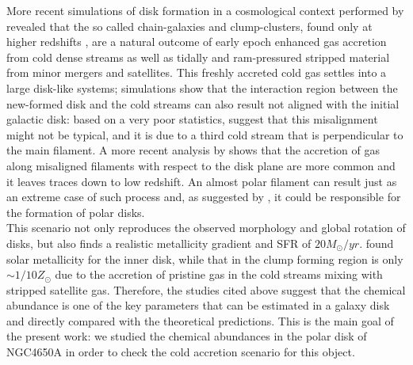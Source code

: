 \documentclass[12pt,preprint]{aastex}
\begin{document}
More recent simulations of disk formation in a cosmological
context performed by \citet{Age09} revealed that the so called
chain-galaxies and clump-clusters, found only at higher
redshifts \citep{Elm07}, are a natural outcome of early epoch
enhanced gas accretion from cold dense streams as well as tidally
and ram-pressured stripped material from minor mergers and
satellites.  This freshly accreted cold gas settles into a large
disk-like systems; simulations show that the interaction region
between the new-formed disk and the cold streams can also result
not aligned with the initial galactic disk: based on a very
poor statistics, \citet{Age09} suggest that this misalignment
might not be typical, and it is due to a third cold stream that is
perpendicular to the main filament. A more recent analysis by
\citet{Dek09N} shows that the accretion of gas along misaligned
filaments with respect to the disk plane are more common and it
leaves traces down to low redshift. An almost polar filament can
result just as an extreme case of such process and, as suggested
by \citet{Age09}, it could be responsible for the formation of
polar disks.\\ This scenario not only reproduces the observed
morphology and global rotation of disks, but also finds a realistic
metallicity gradient and SFR of $20 M_{\odot}/yr$. \citet{Age09}
found solar metallicity for the inner disk, while that in the
clump forming region is only $\sim 1/10 Z_{\odot}$ due to the
accretion of pristine gas in the cold streams mixing with stripped
satellite gas. Therefore, the studies cited above suggest that the
chemical abundance is one of the key parameters that can be
estimated in a galaxy disk and directly compared with the
theoretical predictions. This is the main goal of the present
work: we studied the chemical abundances in the polar disk of
NGC4650A in order to check the cold accretion scenario for this
object.
\end{document}
